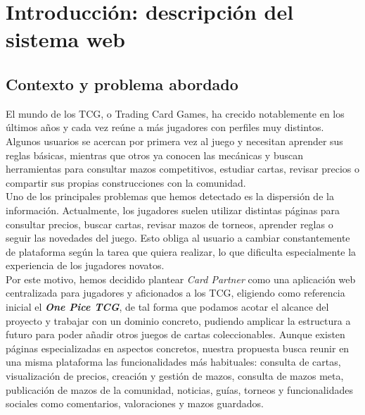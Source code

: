 \documentclass[10pt]{article}
\begin{document}
		
    \section{Introducción: descripción del sistema web}
        
    \subsection{Contexto y problema abordado}        
        El mundo de los TCG, o Trading Card Games, ha crecido notablemente en los últimos años y cada vez reúne a más jugadores con perfiles muy distintos. Algunos usuarios se acercan por primera vez al juego y necesitan aprender sus reglas básicas, mientras que otros ya conocen las mecánicas y buscan herramientas para consultar mazos competitivos, estudiar cartas, revisar precios o compartir sus propias construcciones con la comunidad.\\
        
        Uno de los principales problemas que hemos detectado es la dispersión de la información. Actualmente, los jugadores suelen utilizar distintas páginas para consultar precios, buscar cartas, revisar mazos de torneos, aprender reglas o seguir las novedades del juego. Esto obliga al usuario a cambiar constantemente de plataforma según la tarea que quiera realizar, lo que dificulta especialmente la experiencia de los jugadores novatos.\\
        
        Por este motivo, hemos decidido plantear \textit{Card Partner} como una aplicación web centralizada para jugadores y aficionados a los TCG, eligiendo como referencia inicial el \textit{\textbf{One Pice TCG}}, de tal forma que podamos acotar el alcance del proyecto y trabajar con un dominio concreto, pudiendo amplicar la estructura a futuro para poder añadir otros juegos de cartas coleccionables. Aunque existen páginas especializadas en aspectos concretos, nuestra propuesta busca reunir en una misma plataforma las funcionalidades más habituales: consulta de cartas, visualización de precios, creación y gestión de mazos, consulta de mazos meta, publicación de mazos de la comunidad, noticias, guías, torneos y funcionalidades sociales como comentarios, valoraciones y mazos guardados.
        
\end{document}
